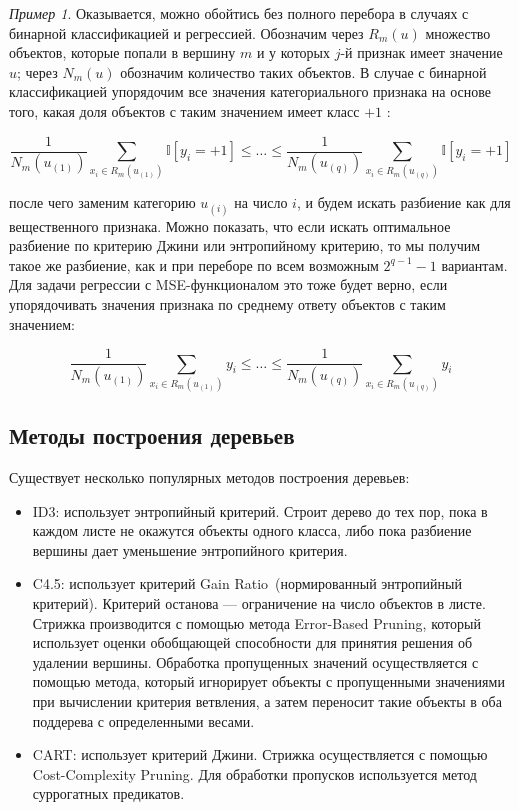\documentclass[a4paper, 12pt]{article}
\theoremstyle{plain} %
\theoremstyle{definition} %
\theoremstyle{remark} %
\newtheorem{example}{Пример}
\begin{document}
\begin{example}
Оказывается, можно обойтись без полного перебора в случаях с бинарной классификацией и регрессией. Обозначим через $  R_m (u) $
множество объектов, которые
попали в вершину $ m $
и у которых $ j $-й признак имеет значение $ u $; через $N_m(u) $
обозначим количество таких объектов.
В случае с бинарной классификацией упорядочим все значения категориального признака на основе того, какая доля объектов с таким значением имеет класс $ +1 $ :

\[
\dfrac{1}{N_m(u_{(1)})} \sum_{x_i \in R_m(u_{(1)})} \mathbb{I}[y_i = +1] \le \dots \le \dfrac{1}{N_m(u_{(q)})} \sum_{x_i \in R_m(u_{(q)})} \mathbb{I}[y_i = +1]
\]

после чего заменим категорию $ u_{(i)} $
на число $ i $, и будем искать разбиение как для вещественного признака. Можно показать, что если искать оптимальное разбиение по
критерию Джини или энтропийному критерию, то мы получим такое же разбиение,
как и при переборе по всем возможным $ 2^{q-1} - 1 $
вариантам.
Для задачи регрессии с MSE-функционалом это тоже будет верно, если упорядочивать значения признака по среднему ответу объектов с таким значением:

\[
\dfrac{1}{N_m(u_{(1)})} \sum_{x_i \in R_m(u_{(1)})} y_i \le \dots \le \dfrac{1}{N_m(u_{(q)})} \sum_{x_i \in R_m(u_{(q)})} y_i
\]

\subsection{Методы построения деревьев}

Существует несколько популярных методов построения деревьев:
\begin{itemize}
    \item ID3: использует энтропийный критерий. Строит дерево до тех пор,
        пока в каждом листе не окажутся объекты одного класса,
        либо пока разбиение вершины дает уменьшение энтропийного критерия.
    \item C4.5: использует критерий Gain Ratio~(нормированный энтропийный критерий).
        Критерий останова --- ограничение на число объектов в листе.
        Стрижка производится с помощью метода Error-Based Pruning,
        который использует оценки обобщающей способности для принятия решения об удалении вершины.
        Обработка пропущенных значений осуществляется с помощью метода,
        который игнорирует объекты с пропущенными значениями при вычислении критерия ветвления,
        а затем переносит такие объекты в оба поддерева с определенными весами.
    \item CART: использует критерий Джини. Стрижка осуществляется с помощью Cost-Complexity Pruning.
        Для обработки пропусков используется метод суррогатных предикатов.
\end{itemize}


\end{example}
\end{document}
